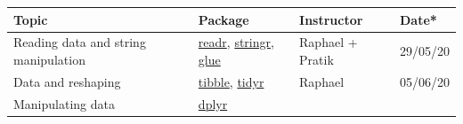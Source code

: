 \documentclass[]{book}
\begin{document}
\begin{longtable}[]{@{}llll@{}}
\toprule
\begin{minipage}[b]{0.22\columnwidth}\raggedright
Topic\strut
\end{minipage} & \begin{minipage}[b]{0.22\columnwidth}\raggedright
Package\strut
\end{minipage} & \begin{minipage}[b]{0.22\columnwidth}\raggedright
Instructor\strut
\end{minipage} & \begin{minipage}[b]{0.22\columnwidth}\raggedright
Date*\strut
\end{minipage}\tabularnewline
\midrule
\endhead
\begin{minipage}[t]{0.22\columnwidth}\raggedright
Reading data and string manipulation\strut
\end{minipage} & \begin{minipage}[t]{0.22\columnwidth}\raggedright
\href{https://readr.tidyverse.org/}{readr}, \href{https://stringr.tidyverse.org/}{stringr}, \href{https://github.com/tidyverse/glue}{glue}\strut
\end{minipage} & \begin{minipage}[t]{0.22\columnwidth}\raggedright
Raphael + Pratik\strut
\end{minipage} & \begin{minipage}[t]{0.22\columnwidth}\raggedright
29/05/20\strut
\end{minipage}\tabularnewline
\begin{minipage}[t]{0.22\columnwidth}\raggedright
Data and reshaping\strut
\end{minipage} & \begin{minipage}[t]{0.22\columnwidth}\raggedright
\href{https://tibble.tidyverse.org/}{tibble}, \href{https://tidyr.tidyverse.org/}{tidyr}\strut
\end{minipage} & \begin{minipage}[t]{0.22\columnwidth}\raggedright
Raphael\strut
\end{minipage} & \begin{minipage}[t]{0.22\columnwidth}\raggedright
05/06/20\strut
\end{minipage}\tabularnewline
\begin{minipage}[t]{0.22\columnwidth}\raggedright
Manipulating data\strut
\end{minipage} & \begin{minipage}[t]{0.22\columnwidth}\raggedright
\href{https://dplyr.tidyverse.org/}{dplyr}\strut

\end{minipage}
\end{longtable}
\end{document}
